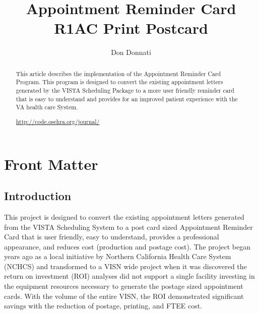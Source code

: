 \documentclass{OSEHRAArticle}
\title{Appointment Reminder Card\\R1AC Print Postcard}
\author{Don Donnati}
\newcommand{\OTJhandlerIDnumber}{5}
\begin{document}
%
%
\OTJhandlefooter{\OTJhandlerIDnumber}


\ifpdf
\else
\fi


\maketitle


\ifhtml
\chapter*{Front Matter\label{front}}
\fi


\begin{abstract}
\noindent
This article describes the implementation of the Appointment Reminder Card
Program. This program is designed to convert the existing appointment letters
generated by the VISTA Scheduling Package to a more user friendly reminder card
that is easy to understand and provides for an improved patient experience with
the VA health care System.
\begin{center}
\url{http://code.osehra.org/journal/}
\end{center}

\end{abstract}

\tableofcontents

\section{Introduction}

This project is designed to convert the existing appointment letters generated from the VISTA
Scheduling System to a post card sized Appointment Reminder Card that is user friendly, easy to
understand, provides a professional appearance, and reduces cost (production and postage cost).
The project began years ago as a local initiative by Northern California Health Care System (NCHCS)
and transformed to a VISN wide project when it was discovered the return on investment (ROI)
analyses did not support a single facility investing in the equipment resources necessary to generate
the postage sized appointment cards. With the volume of the entire VISN, the ROI demonstrated
significant savings with the reduction of postage, printing, and FTEE cost.
\end{document}
